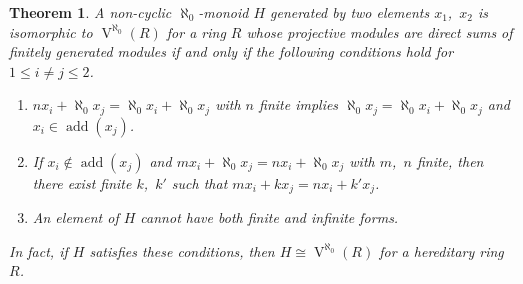 \documentclass[a4paper,11pt,oneside]{amsart}
\newtheorem{teor}{Theorem}[section]
\theoremstyle{remark}
\DeclareMathOperator{\add}{add}
\DeclareMathOperator{\Vmon}{V}
\begin{document}
\begin{teor} \label{hereditarycasecor}
  A non-cyclic $\aleph_0$-monoid $H$ generated by two elements $x_1$,~$x_2$ is isomorphic to $\Vmon^{\aleph_0}(R)$ for a ring $R$ whose projective modules are direct sums of finitely generated modules if and only if the following conditions hold for $1 \leq i \neq j \leq 2$.
  \begin{enumerate}[label=\textup(\roman*\textup),leftmargin=2.5em]
  \item \label{hcc:threeinf} \label{hcc:first} $n x_i + \aleph_0 x_j = \aleph_0 x_i + \aleph_0 x_j$ with $n$ finite implies $\aleph_0 x_j = \aleph_0 x_i +\aleph_0 x_j$ and $x_i \in \add(x_j)$.
  \item \label{hcc:twoinf} If $x_i \not \in \add(x_j)$ and $m x_i + \aleph_0 x_j = n x_i + \aleph_0 x_j$ with $m$,~$n$ finite, then there exist finite $k$,~$k'$ such that $m x_i + k x_j = n x_i + k' x_j$.
  \item \label{hcc:finite-infinite} \label{hcc:last} An element of $H$ cannot have both finite and infinite forms.
  \end{enumerate}
  In fact, if $H$ satisfies these conditions, then $H \cong \Vmon^{\aleph_0}(R)$ for a hereditary ring $R$.
\end{teor}
\end{document}
